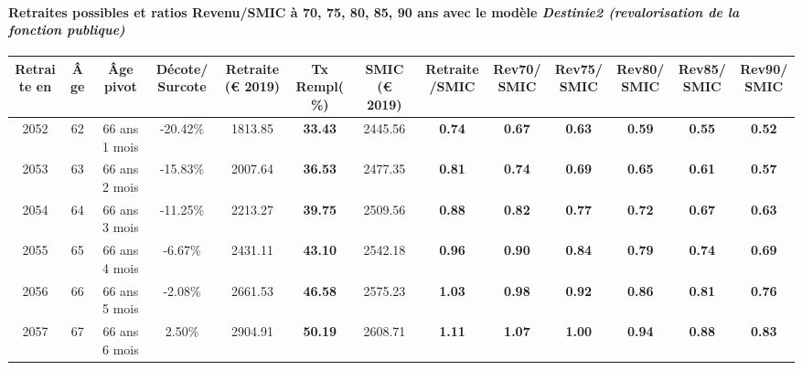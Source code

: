 \paragraph{Retraites possibles et ratios Revenu/SMIC à 70, 75, 80, 85, 90 ans avec le modèle \emph{Destinie2 (revalorisation de la fonction publique)}}  
 
{ \scriptsize \begin{center} 
\begin{tabular}[htb]{|c|c||c|c||c|c||c||c|c|c|c|c|c|} 
\hline 
 Retraite en &  Âge &  Âge pivot &  Décote/Surcote &  Retraite (\euro{} 2019) &  Tx Rempl(\%) &  SMIC (\euro{} 2019) &  Retraite/SMIC &  Rev70/SMIC &  Rev75/SMIC &  Rev80/SMIC &  Rev85/SMIC &  Rev90/SMIC \\ 
\hline \hline 
 2052 &  62 &  66 ans 1 mois &  -20.42\% &  1813.85 &  {\bf 33.43} &  2445.56 &  {\bf {\color{red} 0.74}} &  {\bf {\color{red} 0.67}} &  {\bf {\color{red} 0.63}} &  {\bf {\color{red} 0.59}} &  {\bf {\color{red} 0.55}} &  {\bf {\color{red} 0.52}} \\ 
\hline 
 2053 &  63 &  66 ans 2 mois &  -15.83\% &  2007.64 &  {\bf 36.53} &  2477.35 &  {\bf {\color{red} 0.81}} &  {\bf {\color{red} 0.74}} &  {\bf {\color{red} 0.69}} &  {\bf {\color{red} 0.65}} &  {\bf {\color{red} 0.61}} &  {\bf {\color{red} 0.57}} \\ 
\hline 
 2054 &  64 &  66 ans 3 mois &  -11.25\% &  2213.27 &  {\bf 39.75} &  2509.56 &  {\bf {\color{red} 0.88}} &  {\bf {\color{red} 0.82}} &  {\bf {\color{red} 0.77}} &  {\bf {\color{red} 0.72}} &  {\bf {\color{red} 0.67}} &  {\bf {\color{red} 0.63}} \\ 
\hline 
 2055 &  65 &  66 ans 4 mois &  -6.67\% &  2431.11 &  {\bf 43.10} &  2542.18 &  {\bf {\color{red} 0.96}} &  {\bf {\color{red} 0.90}} &  {\bf {\color{red} 0.84}} &  {\bf {\color{red} 0.79}} &  {\bf {\color{red} 0.74}} &  {\bf {\color{red} 0.69}} \\ 
\hline 
 2056 &  66 &  66 ans 5 mois &  -2.08\% &  2661.53 &  {\bf 46.58} &  2575.23 &  {\bf 1.03} &  {\bf {\color{red} 0.98}} &  {\bf {\color{red} 0.92}} &  {\bf {\color{red} 0.86}} &  {\bf {\color{red} 0.81}} &  {\bf {\color{red} 0.76}} \\ 
\hline 
 2057 &  67 &  66 ans 6 mois &  2.50\% &  2904.91 &  {\bf 50.19} &  2608.71 &  {\bf 1.11} &  {\bf 1.07} &  {\bf 1.00} &  {\bf {\color{red} 0.94}} &  {\bf {\color{red} 0.88}} &  {\bf {\color{red} 0.83}} \\ 
\hline 
\hline 
\end{tabular} 
\end{center} } 

